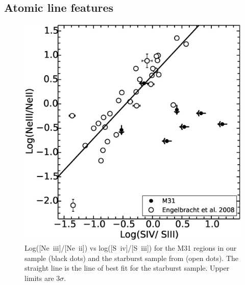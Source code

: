 \subsection{Atomic line features}
\label{sect:atomic}


\begin{figure}
\centering
\includegraphics[scale=0.3]{./NevsS.eps}
\caption{ Log([Ne~{\sc iii}]/[Ne~{\sc ii}])  vs log([S~{\sc iv}]/[S~{\sc iii}])  for the M31 regions in our sample (black dots) and  the starburst sample from \citet{Engelbracht_2008} (open dots). The straight line is the line of best fit for the starburst sample.
Upper limits are $3\sigma$.
}
\label{SvsNe}
\end{figure}

